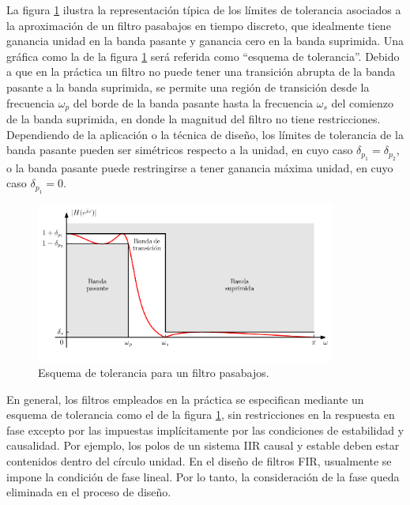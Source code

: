 \documentclass[a4paper]{report}
\begin{document}
La figura \ref{fig:filter_design_specifications} ilustra la representación típica de los límites de tolerancia asociados a la aproximación de un filtro pasabajos en tiempo discreto, que idealmente tiene ganancia unidad en la banda pasante y ganancia cero en la banda suprimida. Una gráfica como la de la figura \ref{fig:filter_design_specifications} será referida como ``esquema de tolerancia''. Debido a que en la práctica un filtro no puede tener una transición abrupta de la banda pasante a la banda suprimida, se permite una región de transición desde la frecuencia \(\omega_p\) del borde de la banda pasante hasta la frecuencia \(\omega_s\) del comienzo de la banda suprimida, en donde la magnitud del filtro no tiene restricciones. Dependiendo de la aplicación o la técnica de diseño, los límites de tolerancia de la banda pasante pueden ser simétricos respecto a la unidad, en cuyo caso \(\delta_{p_1}=\delta_{p_2}\), o la banda pasante puede restringirse a tener ganancia máxima unidad, en cuyo caso \(\delta_{p_1}=0\).
\begin{figure}[!htb]
 \begin{center}
 \includegraphics[width=0.88\textwidth]{figuras/filter_design_specifications.pdf}
 \caption{\label{fig:filter_design_specifications} Esquema de tolerancia para un filtro pasabajos.}
 \end{center}
\end{figure}

En general, los filtros empleados en la práctica se especifican mediante un esquema de tolerancia como el de la figura \ref{fig:filter_design_specifications}, sin restricciones en la respuesta en fase excepto por las impuestas implícitamente por las condiciones de estabilidad y causalidad. Por ejemplo, los polos de un sistema IIR causal y estable deben estar contenidos dentro del círculo unidad. En el diseño de filtros FIR, usualmente se impone la condición de fase lineal. Por lo tanto, la consideración de la fase queda eliminada en el proceso de diseño.
\end{document}

